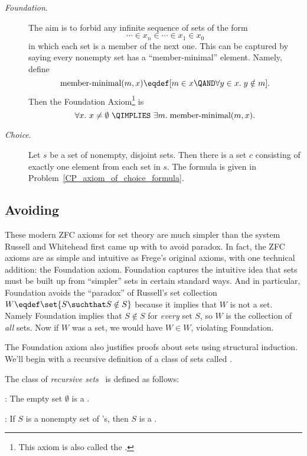 \begin{description}
\item[\emph{Foundation}.]  The aim is to forbid any infinite
  sequence of sets of the form
\[
\cdots \in x_n \in \cdots \in x_1 \in x_0
\]
in which each set is a member of the next one.  This can be
captured by saying every nonempty set has a ``member-minimal''
element.  Namely, define
\[
\text{member-minimal}(m, x) \eqdef [m \in x \QAND \forall y \in x.\; y \notin m].
\]
Then the Foundation Axiom\footnote{This axiom is also called the
  .} is
\[
\forall x.\ x \neq \emptyset\ \QIMPLIES\ \exists m.\; \text{member-minimal}(m, x).
\]

\item[\emph{Choice}.]  Let $s$
  be a set of nonempty, disjoint sets.  Then there is a set $c$
  consisting of exactly one element from each set in $s$.  The formula
  is given in Problem~\ref{CP_axiom_of_choice_formula}.

\end{description}

\subsection{Avoiding }\label{avoidingrussellsparadox}

These modern ZFC axioms for set theory are much simpler than the
system Russell and Whitehead first came up with to avoid paradox.  In
fact, the ZFC axioms are as simple and intuitive as Frege's original
axioms, with one technical addition: the Foundation axiom.  Foundation
captures the intuitive idea that sets must be built up from
``simpler'' sets in certain standard ways.  And in particular,
Foundation avoids the ``paradox'' of Russell's set collection $W
\eqdef \set{S \suchthat S\notin S}$ because it implies that $W$ is not
a set.  Namely Foundation implies that $S \not \in S$ for \emph{every}
set $S$, so $W$ is the collection of \emph{all} sets.  Now if $W$ was
a set, we would have $W \in W$, violating Foundation.

The Foundation axiom also justifies proofs about sets using structural
induction.  We'll begin with a recursive definition of a class of sets
called \recset.  
\begin{definition}\label{recset_def}
The class of \emph{recursive sets} \recset\ is defined as follows:

: The empty set $\emptyset$ is a \recset.

: If $S$ is a nonempty set of
\recset's, then $S$ is a \recset.
\end{definition}

